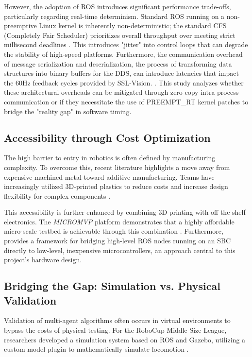 \documentclass[a4paper,twoside,12pt]{report}
\begin{document}
However, the adoption of ROS introduces significant performance trade-offs, particularly regarding real-time determinism. 
Standard ROS running on a non-preemptive Linux kernel is inherently non-deterministic; the standard CFS (Completely Fair Scheduler) prioritizes overall throughput over meeting strict millisecond deadlines \cite{kronauer2021latency}. 
This introduces "jitter" into control loops that can degrade the stability of high-speed platforms. 
Furthermore, the communication overhead of message serialization and deserialization, the process of transforming data structures into binary buffers for the DDS, can introduce latencies that impact the 60Hz feedback cycles provided by SSL-Vision. \cite{gutierrez2018towards}. 
This study analyzes whether these architectural overheads can be mitigated through zero-copy intra-process communication or if they necessitate the use of PREEMPT\_RT kernel patches to bridge the "reality gap" in software timing.

\subsection{Accessibility through Cost Optimization}
The high barrier to entry in robotics is often defined by manufacturing complexity. To overcome this, recent literature highlights a move away from expensive machined metal toward additive manufacturing. Teams have increasingly utilized 3D-printed plastics to reduce costs and increase design flexibility for complex components \cite{liang2025first}. 

This accessibility is further enhanced by combining 3D printing with off-the-shelf electronics. The \textit{MICROMVP} platform demonstrates that a highly affordable micro-scale testbed is achievable through this combination \cite{yu2017portable}. Furthermore, \cite{joseph2018robot} provides a framework for bridging high-level ROS nodes running on an SBC directly to low-level, inexpensive microcontrollers, an approach central to this project’s hardware design.

\subsection{Bridging the Gap: Simulation vs. Physical Validation}
Validation of multi-agent algorithms often occurs in virtual environments to bypass the costs of physical testing. For the RoboCup Middle Size League, researchers developed a simulation system based on ROS and Gazebo, utilizing a custom model plugin to mathematically simulate locomotion \cite{yao2015simulation}. 
\end{document}
